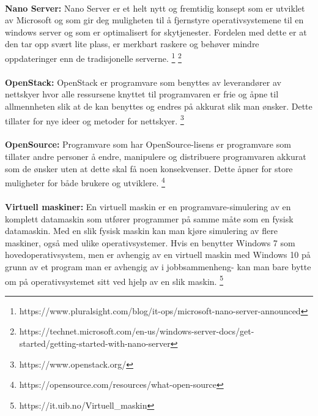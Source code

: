 \paragraph{} {\bfseries Nano Server:} Nano Server er et helt nytt og fremtidig konsept som er utviklet av Microsoft og som gir deg muligheten til å fjernstyre operativsystemene til en windows server og som er optimalisert for skytjenester. Fordelen med dette er at den tar opp svært lite plass, er merkbart raskere og behøver mindre oppdateringer enn de tradisjonelle serverne.
\footnote{https://www.pluralsight.com/blog/it-ops/microsoft-nano-server-announced}
\footnote{https://technet.microsoft.com/en-us/windows-server-docs/get-started/getting-started-with-nano-server}

\paragraph{} {\bfseries OpenStack:} OpenStack er programvare som benyttes av leverandører av nettskyer hvor alle ressursene knyttet til programvaren er frie og åpne til allmennheten slik at de kan benyttes og endres på akkurat slik man ønsker. Dette tillater for nye ideer og metoder for nettskyer.
\footnote{https://www.openstack.org/}

\paragraph{} {\bfseries OpenSource:} Programvare som har OpenSource-lisens er programvare som tillater andre personer å endre, manipulere og distribuere programvaren akkurat som de ønsker uten at dette skal få noen konsekvenser. Dette åpner for store muligheter for både brukere og utviklere.
\footnote{https://opensource.com/resources/what-open-source}

\paragraph{} {\bfseries Virtuell maskiner:} En virtuell maskin er en programvare-simulering av en komplett datamaskin som utfører programmer på samme måte som en fysisk datamaskin. Med en slik fysisk maskin kan man kjøre simulering av flere maskiner, også med ulike operativsystemer. Hvis en benytter Windows 7 som hovedoperativsystem, men er avhengig av en virtuell maskin med Windows 10 på grunn av et program man er avhengig av i jobbsammenheng- kan man bare bytte om på operativsystemet sitt ved hjelp av en slik maskin. \footnote{https://it.uib.no/Virtuell\_maskin}
